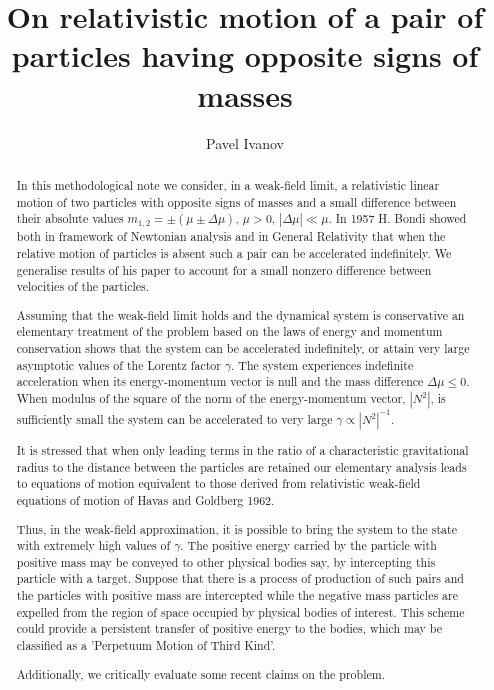 \documentclass[aip,nofootinbib]{revtex4}
\begin{document}
\preprint{  }

\title{On relativistic motion of a pair of particles having opposite signs of masses}%

\author{Pavel Ivanov}
%




\begin{abstract}

In this methodological note we consider, in a weak-field limit, a
relativistic linear motion of two particles with opposite signs of
masses and a small difference between their absolute values
$m_{1,2}=\pm (\mu\pm \Delta \mu) $, $\mu > 0$, $|\Delta \mu | \ll
\mu$. In 1957 H. Bondi  showed both in framework of Newtonian
analysis and in General Relativity that when the relative motion
of particles is absent such a pair can be accelerated
indefinitely. We generalise results of his paper to account for a
small nonzero difference between velocities of the particles.

Assuming that the weak-field limit holds and the dynamical system
is conservative an elementary treatment of the problem based on
the laws of energy and momentum conservation shows that the system
can be accelerated indefinitely, or attain very large asymptotic
values of the Lorentz factor $\gamma$. The system experiences
indefinite acceleration when its  energy-momentum vector is null
and the mass difference $\Delta \mu \le 0$. When modulus of the
square of the norm of the energy-momentum vector, $|N^2|$, is
sufficiently small the system can be accelerated to very large
$\gamma \propto |N^2|^{-1}$.

It is stressed that when only leading terms in the ratio of a
characteristic gravitational radius to the distance between the
particles are retained our elementary analysis leads to equations
of motion equivalent to those derived from relativistic weak-field
equations of motion of Havas and Goldberg 1962.

Thus, in the weak-field approximation, it is possible to bring the
system to the state with extremely high values of $\gamma $. The
positive energy carried by the particle with positive mass may be
conveyed to other physical bodies say, by intercepting this
particle with a target. Suppose that there is a process of
production of such pairs and the particles with positive mass are
intercepted while the negative mass particles are expelled from
the region of space occupied by physical bodies of interest. This
scheme could provide a persistent transfer of positive energy to
the bodies, which may be classified as a 'Perpetuum Motion of
Third Kind'.

Additionally, we critically evaluate some recent claims on the
problem.

\end{abstract}
\end{document}
